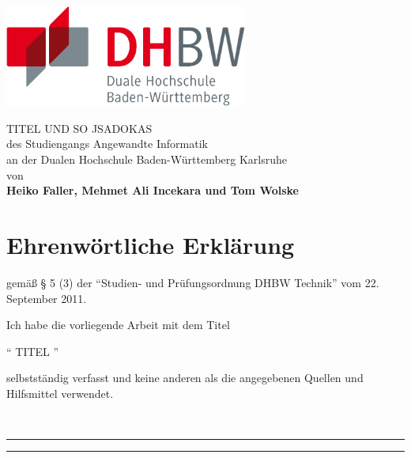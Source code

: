 \documentclass[fontsize=12pt,DIV=11,BCOR=4mm,fleqn]{scrartcl}
\begin{document}
	\begin{titlepage}
		\begin{center}
			\includegraphics[width=8cm]{dhbw.pdf}
			
			\vfill
			\begin{singlespacing}
				{\Huge TITEL UND SO} \vspace{1.7cm}
				{\Large JSADOKAS}	\\ [0.25cm]
				{\large des Studiengangs Angewandte Informatik}	\\ [0.25cm]
				{\large an der Dualen Hochschule Baden-Württemberg Karlsruhe}	\\[0.25cm]
				{\large von} 	\\ [0.25cm]
				{\large \bfseries Heiko Faller, Mehmet Ali Incekara und Tom Wolske}	\\ [1cm]
			\end{singlespacing} 
			\vfill
		\end{center}
	\end{titlepage}
	\clearscrheadings
	
	\vspace*{2.5cm}
	\section*{Ehrenwörtliche Erklärung}
	gemäß § 5 (3) der "`Studien- und Prüfungsordnung DHBW Technik"' vom 22. September 2011. \vspace{5pt}

	Ich habe die vorliegende Arbeit mit dem Titel
	
	\begin{center}
		"` TITEL "'
	\end{center}
	
	selbstständig verfasst und keine anderen als die angegebenen Quellen und Hilfsmittel verwendet.

	\vspace{2cm}
		\hfill	\\ %
	\rule{5cm}{0.4pt} \hfill	\rule{5cm}{0.4pt} \\
	 \hfill	{} 
	
\end{document}

